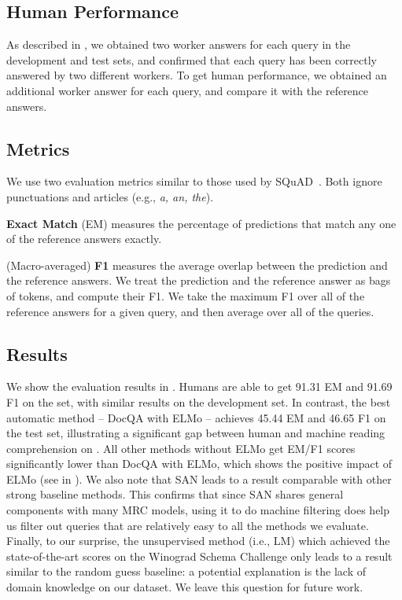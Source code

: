 \subsection{Human Performance}
As described in , we obtained two worker answers for each query in the development and test sets, and confirmed that each query has been correctly answered by two different workers. 
To get human performance, we obtained an additional worker answer for each query, and compare it with the reference answers.

\subsection{Metrics}
We use two evaluation metrics similar to those used by SQuAD~\cite{squad}.
Both ignore punctuations and articles (e.g., \emph{a, an, the}).

\noindent\textbf{Exact Match} (EM) measures the percentage of predictions that match any one of the reference answers exactly.

\noindent(Macro-averaged) \textbf{F1} measures the average overlap between the prediction and the reference answers. 
We treat the prediction and the reference answer as bags of tokens, and compute their F1.
We take the maximum F1 over all of the reference answers for a given query, and then average over all of the queries.

\subsection{Results}
We show the evaluation results in .
Humans are able to get 91.31 EM and 91.69 F1 on the set, with similar results on the development set.
In contrast, the best automatic method -- DocQA with ELMo --  achieves 45.44 EM and 46.65 F1 on the test set, illustrating a significant gap between human and machine reading comprehension on \ReCoRD.
All other methods without ELMo get EM/F1 scores significantly lower than DocQA with ELMo,
which shows the positive impact of ELMo (see in ).
We also note that SAN leads to a result comparable with other strong baseline methods. 
This confirms that since SAN shares general components with many MRC models, using it to do machine filtering does help us filter out queries that are relatively easy to all the methods we evaluate. 
Finally, to our surprise, the unsupervised method (i.e., LM) which achieved the state-of-the-art scores on the Winograd Schema Challenge only leads to a result similar to the random guess baseline: a potential explanation is the lack of domain knowledge on our dataset.
We leave this question for future work.


